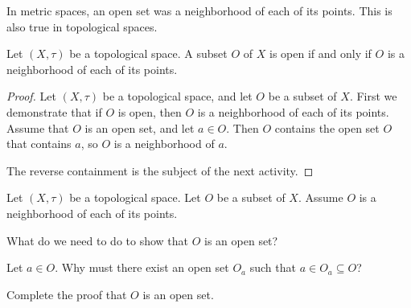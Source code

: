 \begin{comment}

\ActivitySolution

\ba
\item The open sets that contain $a$ are $\{a\}$, $\{a,b\}$, and $X$. So the neighborhoods of $a$ are the subsets of $X$ that contain these open sets, or 
\[\{a\}, \ \{a,b\}, \ \{a,c\}, \ \{a,d\}, \ \{a,b,c\}, \ \{a,b,d\}, \ \text{ and } \ X.\] 

\item The only open set containing $c$ is $X$, so $X$ is the only neighborhood of $c$. 

\ea

\end{comment}

In metric spaces, an open set was a neighborhood of each of its points. This is also true in topological spaces.

\begin{theorem} Let $(X, \tau)$ be a topological space. A subset $O$ of $X$ is open if and only if $O$ is a neighborhood of each of its points.
\end{theorem}

\begin{proof} Let $(X, \tau)$ be a topological space, and let $O$ be a subset of $X$. First we demonstrate that if $O$ is open, then $O$ is a neighborhood of each of its points. Assume that $O$ is an open set, and let $a \in O$. Then $O$ contains the open set $O$ that contains $a$, so $O$ is a neighborhood of $a$.

The reverse containment is the subject of the next activity.
\end{proof}

\begin{activity} Let $(X, \tau)$ be a topological space. Let $O$ be a subset of $X$. Assume $O$ is a neighborhood of each of its points. 
\ba
\item  What do we need to do to show that $O$ is an open set?

\item Let $a \in O$. Why must there exist an open set $O_a$ such that $a \in O_a \subseteq O$?

\item Complete the proof that $O$ is an open set. 

\ea

\end{activity}

